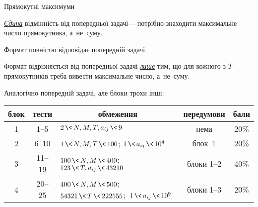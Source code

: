 \begin{problemAllDefault}{Прямокутні максимуми}


\underline{\emph{Єдина}} відмінність 
від попередньої задачі\nolinebreak[3] --- 
потрібно знаходити максимальне число прямокутника, а~не~суму. 

\InputFile
Формат повністю відповідає попередній задачі.

\OutputFile
Формат відрізняється від попередньої задачі \underline{\emph{лише}} тим, що для кожного з $T$ прямокутників треба вивести максимальне число, а~не~суму.

\Scoring
Аналогічно попередній задачі, але блоки %
трохи інші:


\begin{small}

\noindent\begin{tabular}{@{}c|c|p{}|c|c@{}}
блок
&
тести
&
\multicolumn{1}{c|}{обмеження}
&
перед\-умови
&
бали
\\\hline\hline%
1 & 
1--5 & 
${2\,{\<}\,N,M,T,a_{ij}\,{\<}\,9}$ & 
нема & 
20\% 
\\\hline
2 & 
6--10 & 
${1\,{\<}\,N,M,T\,{\<}\,100}$; ${1\,{\<}\,a_{ij}\,{\<}\,10^4}$ &
блок~1 & 
20\% \\\hline
3 &
11--19 & 
${100\,{\<}\,N,M\,{\<}\,400}$; ${123\,{\<}\,T,a_{ij}\,{\<}\,43210}$ &
блоки \mbox{1--2} & 
40\% \\\hline
4 &
20--25 & 
${400\,{\<}\,N,M\,{\<}\,500}$; ${54321\,{\<}\,T\,{\<}\,222555}$;\hfill~\linebreak ${1\,{\<}\,a_{ij}\,{\<}\,10^9}$ &
блоки \mbox{1--3} & 
20\% \\
\end{tabular}


\end{small}
\end{problemAllDefault}
